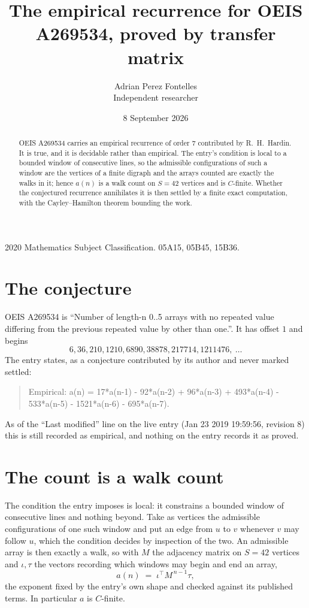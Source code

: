 \documentclass[11pt,a4paper]{article}
\title{The empirical recurrence for OEIS A269534, proved by transfer matrix}
\author{Adrian Perez Fontelles\\ \small Independent researcher}
\date{8 September 2026}
\theoremstyle{plain}
\theoremstyle{definition}
\begin{document}
\maketitle

\begin{abstract}
OEIS A269534 carries an empirical recurrence of order $7$ contributed by R.~H.~Hardin. It is
true, and it is decidable rather than empirical. The entry's condition is local to a bounded window of consecutive lines, so
the admissible configurations of such a window are the vertices of a finite digraph and the
arrays counted are exactly the walks in it; hence $a(n)$ is a walk count on $S=42$ vertices
and is $C$-finite. Whether the conjectured recurrence annihilates it is then settled by a
finite exact computation, with the Cayley--Hamilton theorem bounding the work.
\end{abstract}

\noindent\small 2020 Mathematics Subject Classification. 05A15, 05B45, 15B36.\normalsize

\section{The conjecture}

OEIS A269534 is ``Number of length-n 0..5 arrays with no repeated value differing from the previous repeated value by other than one.''. It has offset $1$ and begins
\[
6, 36, 210, 1210, 6890, 38878, 217714, 1211476,\ \dots
\]
The entry states, as a conjecture contributed by its author and never marked settled:
\begin{quote}
Empirical: a(n) = 17*a(n-1) - 92*a(n-2) + 96*a(n-3) + 493*a(n-4) - 533*a(n-5) - 1521*a(n-6) - 695*a(n-7).
\end{quote}
As of the ``Last modified'' line on the live entry (Jan 23 2019 19:59:56, revision 8) this is still
recorded as empirical, and nothing on the entry records it as proved.

\section{The count is a walk count}

The condition the entry imposes is local: it constrains a bounded window of consecutive lines and nothing beyond. Take as
vertices the admissible configurations of one such window and put an edge from $u$ to $v$
whenever $v$ may follow $u$, which the condition decides by inspection of the two. An
admissible array is then exactly a walk, so with $M$ the adjacency matrix on $S=42$ vertices
and $\iota,\tau$ the vectors recording which windows may begin and end an array,
\[
a(n)\;=\;\iota^{\!\top}M^{\,n-1}\tau ,
\]
the exponent fixed by the entry's own shape and checked against its published terms. In
particular $a$ is $C$-finite.
\end{document}

